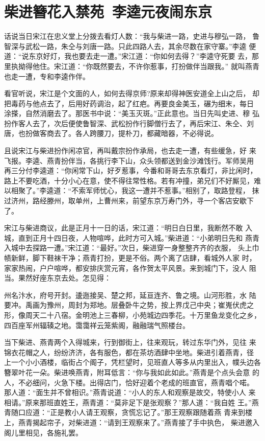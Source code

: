 \chapter{柴进簪花入禁苑~李逵元夜闹东京}

话说当日宋江在忠义堂上分拨去看灯人数：“我与柴进一路，史进与穆弘一路，
鲁智深与武松一路，朱仝与刘唐一路。只此四路人去，其余尽数在家守寨。”李逵
便道：“说东京好灯，我也要去走一遭。”宋江道：“你如何去得？”李逵守死要
去，那里执拗得他住。宋江道：“你既然要去，不许你惹事，打扮做伴当跟我。”
就叫燕青也走一遭，专和李逵作伴。

看官听说，宋江是个文面的人，如何去得京师?原来却得神医安道全上山之后，
却把毒药与他点去了，后用好药调治，起了红疤。再要良金美玉，碾为细末，每日
涂搽，自然消磨去了。那医书中说：“美玉灭斑。”正此意也。当日先叫史进、穆
弘扮作客人去了，次后便使鲁智深、武松扮作行脚僧行去了，再后宋江、朱仝、刘
唐，也扮做客商去了。各人跨腰刀，提朴刀，都藏暗器，不必得说。

且说宋江与柴进扮作闲凉官，再叫戴宗扮作承局，也去走一遭，有些缓急，好
来飞报。李逵、燕青扮伴当，各挑行李下山，众头领都送到金沙滩饯行。军师吴用
再三分付李逵道：“你闲常下山，好歹惹事，今番和哥哥去东京看灯，非比闲时，
路上不要吃酒，十分小心在意，使不得往常性格。若有冲撞，弟兄们不好厮见，难
以相聚了。”李逵道：“不索军师忧心，我这一遭并不惹事。”相别了，取路登程，
抹过济州，路经滕州，取单州，上曹州来，前望东京万寿门外，寻一个客店安歇下
了。

宋江与柴进商议，此是正月十一日的话，宋江道：“明日白日里，我断然不敢
入城，直到正月十四日夜，人物喧哗，此时方可入城。”柴进道：“小弟明日先和
燕青入城中去探路一遭。”宋江道：“最好。”次日，柴进穿一身整整齐齐的衣服，
头上巾帻新鲜，脚下鞋袜干净；燕青打扮，更是不俗。两个离了店肆，看城外人家
时，家家热闹，户户喧哗，都安排庆赏元宵，各作贺太平风景。来到城门下，没人
阻当。果然好座东京去处。怎见得：

州名汴水，府号开封。逶迤接吴、楚之邦，延亘连齐、鲁之境。山河形胜，水
陆要冲。禹画为豫州，周封为郑地。层叠卧牛之势，按上界戊己中央；崔嵬伏虎之
形，像周天二十八宿。金明池上三春柳，小苑城边四季花。十万里鱼龙变化之乡，
四百座军州辐辏之地。霭霭祥云笼紫阁，融融瑞气照楼台。

当下柴进、燕青两个入得城来，行到御街上，往来观玩，转过东华门外，见往
来锦衣花帽之人，纷纷济济，各有服色，都在茶坊酒肆中坐地。柴进引着燕青，径
上一个小小酒楼，临街占个阁子，凭栏望时，见班直人等多从内里出入，幞头边各
簪翠叶花一朵。柴进唤燕青，附耳低言：“你与我如此如此。”燕青是个点头会意
的人，不必细问，火急下楼。出得店门，恰好迎着个老成的班直官，燕青唱个喏。
那人道：“面生并不曾相识。”燕青说道：“小人的东人和观察是故交，特使小人
来相请。”原来那班直姓王，燕青道：“莫非足下是张观察？”那人道：“我自姓
王。”燕青随口应道：“正是教小人请王观察，贪慌忘记了。”那王观察跟随着燕
青来到楼上，燕青揭起帘子，对柴进道：“请到王观察来了。”燕青接了手中执色，
柴进邀入阁儿里相见，各施礼罢。

